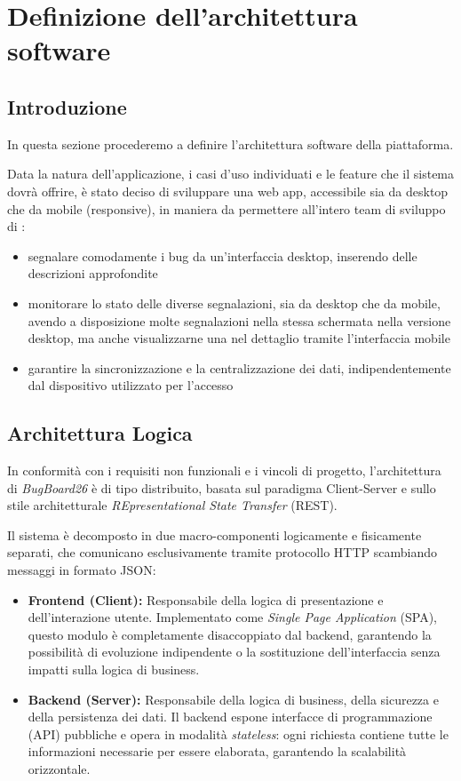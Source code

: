 \chapter{Definizione dell'architettura software}

\section{Introduzione}
In questa sezione procederemo a definire l'architettura software della piattaforma.

Data la natura dell'applicazione, i casi d'uso individuati e le feature che il sistema dovrà offrire, è stato deciso di sviluppare una web app, accessibile sia da desktop che da mobile (responsive), in maniera da permettere all'intero team di sviluppo di :
\begin{itemize}
    \item segnalare comodamente i bug da un'interfaccia desktop, inserendo delle descrizioni approfondite
    \item monitorare lo stato delle diverse segnalazioni, sia da desktop che da mobile, avendo a disposizione molte segnalazioni nella stessa  schermata nella versione desktop, ma anche visualizzarne una nel dettaglio tramite l'interfaccia mobile
    \item garantire la sincronizzazione e la centralizzazione dei dati, indipendentemente dal dispositivo utilizzato per l'accesso
\end{itemize}

\section{Architettura Logica}
In conformità con i requisiti non funzionali e i vincoli di progetto, l'architettura di \textit{BugBoard26} è di tipo distribuito, basata sul paradigma Client-Server e sullo stile architetturale \textit{REpresentational State Transfer} (REST).

Il sistema è decomposto in due macro-componenti logicamente e fisicamente separati, che comunicano esclusivamente tramite protocollo HTTP scambiando messaggi in formato JSON:

\begin{itemize}
    \item \textbf{Frontend (Client):} Responsabile della logica di presentazione e dell'interazione utente. Implementato come \textit{Single Page Application} (SPA), questo modulo è completamente disaccoppiato dal backend, garantendo la possibilità di evoluzione indipendente o la sostituzione dell'interfaccia senza impatti sulla logica di business.
    \item \textbf{Backend (Server):} Responsabile della logica di business, della sicurezza e della persistenza dei dati. Il backend espone interfacce di programmazione (API) pubbliche e opera in modalità \textit{stateless}: ogni richiesta contiene tutte le informazioni necessarie per essere elaborata, garantendo la scalabilità orizzontale.
\end{itemize}

